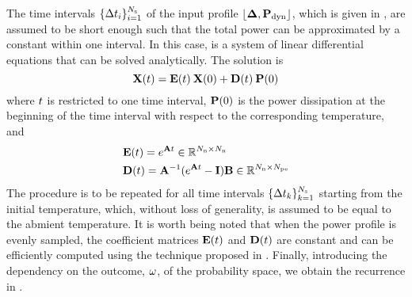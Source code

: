 The time intervals $\{ \Delta t_i \}_{i = 1}^{N_\text{s}}$ of the input profile $\profPdyn$, which is given in , are assumed to be short enough such that the total power can be approximated by a constant within one interval. In this case,  is a system of linear differential equations that can be solved analytically. The solution is \cite{ukhov2012}
\begin{equation} \elabel{ode-solution}
  \vX(\t) = \mE(\t) \: \vX(0) + \mD(\t) \: \vP(0)
\end{equation}
where $t$ is restricted to one time interval, $\mathbf{P}(0)$ is the power dissipation at the beginning of the time interval with respect to the corresponding temperature, and
\begin{align*}
  & \mE(\t) = e^{\mA \t} \in \real^{\nodes \times \nodes} \\
  & \mD(\t) = \mA^{-1} (e^{\mA \t} - \mI) \mB \in \real^{\nodes \times \cores}
\end{align*}
The procedure is to be repeated for all time intervals $\{ \Delta t_k \}_{k=1}^{N_\text{s}}$ starting from the initial temperature, which, without loss of generality, is assumed to be equal to the abmient temperature. It is worth being noted that when the power profile is evenly sampled, the coefficient matrices $\mE(\t)$ and $\mD(\t)$ are constant and can be efficiently computed using the technique proposed in \cite{ukhov2012}.  Finally, introducing the dependency on the outcome, $\omega$, of the probability space, we obtain the recurrence in .
